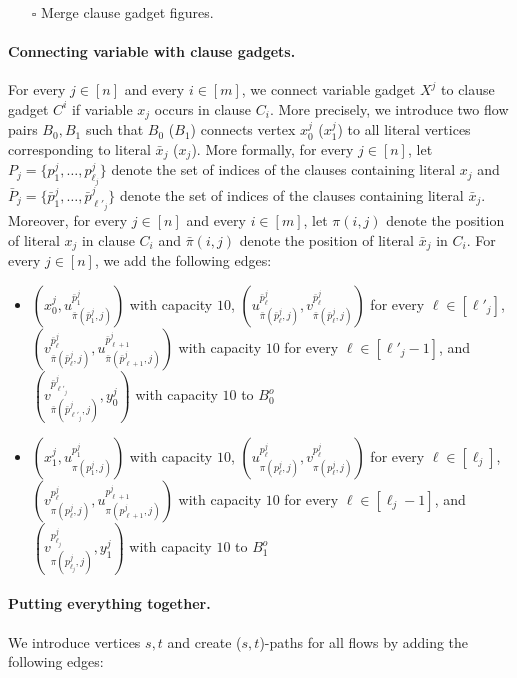 \documentclass[fontsize=11pt,paper=a4]{book}
\begin{document}
\begin{itemize}
\item[{$\square$}] Merge clause gadget figures.
\end{itemize}

\paragraph{Connecting variable with clause gadgets.}
For every \(j\in[n]\) and every \(i\in[m]\), we connect variable gadget \(X^j\) to clause gadget \(C^i\) if variable \(x_j\) occurs in clause \(C_i\).
More precisely, we introduce two flow pairs \(B_0,B_1\) such that \(B_0\) (\(B_1\)) connects vertex \(x_0^j\) (\(x_1^j\)) to all literal vertices corresponding to literal \(\bar{x}_j\) (\(x_j\)).
More formally, for every \(j\in[n]\), let \(P_j=\{p_1^j,\dots,p_{\ell_j}^j\}\) denote the set of indices of the clauses containing literal \(x_j\) and \(\bar{P}_j=\{\bar{p}_1^j,\dots,\bar{p}_{\ell'_j}^j\}\) denote the set of indices of the clauses containing literal \(\bar{x}_j\).
Moreover, for every \(j\in[n]\) and every \(i\in[m]\), let \(\pi(i,j)\) denote the position of literal \(x_j\) in clause \(C_i\) and \(\bar{\pi}(i,j)\) denote the position of literal \(\bar{x}_j\) in \(C_i\).
For every \(j\in[n]\), we add the following edges:

\begin{itemize}
\item \((x_0^j,u_{\bar{\pi}(\bar{p}_1^j,j)}^{\bar{p}_1^j})\) with capacity \(10\), \((u_{\bar{\pi}(\bar{p}_{\ell}^j,j)}^{\bar{p}_{\ell}^j},v_{\bar{\pi}(\bar{p}_{\ell}^j,j)}^{\bar{p}_{\ell}^j})\) for every \(\ell\in[\ell'_j]\), \((v_{\bar{\pi}(\bar{p}_{\ell}^j,j)}^{\bar{p}_{\ell}^j},u_{\bar{\pi}(\bar{p}_{\ell+1}^j,j)}^{\bar{p}_{\ell+1}^j})\) with capacity \(10\) for every \(\ell\in[\ell'_j-1]\), and \((v_{\bar{\pi}(\bar{p}_{\ell'_j}^j,j)}^{\bar{p}_{\ell'_j}^j},y_0^j)\) with capacity \(10\) to \(B_0^o\)
\item \((x_1^j,u_{\pi(p_1^j,j)}^{p_1^j})\) with capacity \(10\), \((u_{\pi(p_{\ell}^j,j)}^{p_{\ell}^j},v_{\pi(p_{\ell}^j,j)}^{p_{\ell}^j})\) for every \(\ell\in[\ell_j]\), \((v_{\pi(p_{\ell}^j,j)}^{p_{\ell}^j},u_{\pi(p_{\ell+1}^j,j)}^{p_{\ell+1}^j})\) with capacity \(10\) for every \(\ell\in[\ell_j-1]\), and \((v_{\pi(p_{\ell_j}^j,j)}^{p_{\ell_j}^j},y_1^j)\) with capacity \(10\) to \(B_1^o\)
\end{itemize}

\paragraph{Putting everything together.}
We introduce vertices \(s,t\) and create (\(s,t\))-paths for all flows by adding the following edges:
\end{document}
